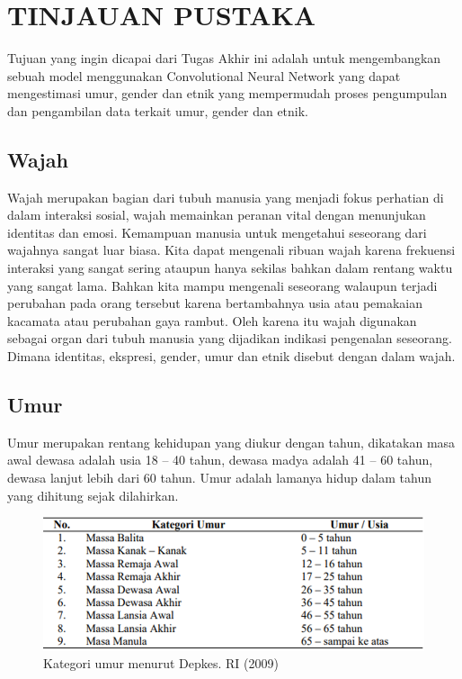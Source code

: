 \section{TINJAUAN PUSTAKA}

Tujuan yang ingin dicapai dari Tugas Akhir ini adalah untuk mengembangkan sebuah model menggunakan 
Convolutional Neural Network yang dapat mengestimasi umur, gender dan etnik yang mempermudah proses 
pengumpulan dan pengambilan data terkait umur, gender dan etnik.

\subsection{Wajah}


Wajah merupakan bagian dari tubuh manusia yang menjadi fokus perhatian di dalam interaksi sosial, 
wajah memainkan peranan vital dengan menunjukan identitas dan emosi. Kemampuan manusia untuk mengetahui 
seseorang dari wajahnya sangat luar biasa. Kita dapat mengenali ribuan wajah karena frekuensi interaksi 
yang sangat sering ataupun hanya sekilas bahkan dalam rentang waktu yang sangat lama. Bahkan kita mampu 
mengenali seseorang walaupun terjadi perubahan pada orang tersebut karena bertambahnya usia atau 
pemakaian kacamata atau perubahan gaya rambut. Oleh karena itu wajah digunakan sebagai organ dari tubuh 
manusia yang dijadikan indikasi pengenalan seseorang. Dimana identitas, ekspresi, gender, umur dan etnik 
disebut dengan dalam wajah.

\subsection{Umur}
Umur merupakan rentang kehidupan yang diukur dengan tahun, dikatakan masa awal dewasa adalah usia 18 – 40 
tahun, dewasa madya adalah 41 – 60 tahun, dewasa lanjut lebih dari 60 tahun. Umur adalah lamanya hidup 
dalam tahun yang dihitung sejak dilahirkan.
\begin{figure} [H] \centering
    \includegraphics[scale=0.6]{gambar/umur.png}
    \caption{Kategori umur menurut Depkes. RI (2009)}
    \label{fig:Umur}
\end{figure}

